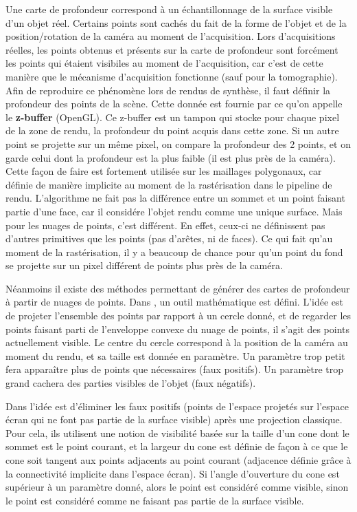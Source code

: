 \documentclass{report}
\begin{document}
Une carte de profondeur correspond à un échantillonnage de la surface visible d'un objet réel. Certains points sont cachés du fait de la forme de l'objet et de la position/rotation de la caméra au moment de l'acquisition. Lors d'acquisitions réelles, les points obtenus et présents sur la carte de profondeur sont forcément les points qui étaient visibiles au moment de l'acquisition, car c'est de cette manière que le mécanisme d'acquisition fonctionne (sauf pour la tomographie).
Afin de reproduire ce phénomène lors de rendus de synthèse, il faut définir la profondeur des points de la scène.
Cette donnée est fournie par ce qu'on appelle le \textbf{z-buffer} (OpenGL). Ce z-buffer est un tampon qui stocke pour chaque pixel de la zone de rendu, la profondeur du point acquis dans cette zone. Si un autre point se projette sur un même pixel, on compare la profondeur des 2 points, et on garde celui dont la profondeur est la plus faible (il est plus près de la caméra).
Cette façon de faire est fortement utilisée sur les maillages polygonaux, car définie de manière implicite au moment de la rastérisation dans le pipeline de rendu. L'algorithme ne fait pas la différence entre un sommet et un point faisant partie d'une face, car il considére l'objet rendu comme une unique surface.
Mais pour les nuages de points, c'est différent. En effet, ceux-ci ne définissent pas d'autres primitives que les points (pas d'arêtes, ni de faces).
Ce qui fait qu'au moment de la rastérisation, il y a beaucoup de chance pour qu'un point du fond se projette sur un pixel différent de points plus près de la caméra.

Néanmoins il existe des méthodes permettant de générer des cartes de profondeur à partir de nuages de points.
Dans \cite{}, un outil mathématique est défini. L'idée est de projeter l'ensemble des points par rapport à un cercle donné, et de regarder les points faisant parti de l'enveloppe convexe du nuage de points, il s'agit des points actuellement visible.
Le centre du cercle correspond à la position de la caméra au moment du rendu, et sa taille est donnée en paramètre.
Un paramètre trop petit fera apparaître plus de points que nécessaires (faux positifs).
Un paramètre trop grand cachera des parties visibles de l'objet (faux négatifs).

Dans \cite{} l'idée est d'éliminer les faux positifs (points de l'espace projetés sur l'espace écran qui ne font pas partie de la surface visible) après une projection classique. Pour cela, ils utilisent une notion de visibilité basée sur la taille d'un cone dont le sommet est le point courant, et la largeur du cone est définie de façon à ce que le cone soit tangent aux points adjacents au point courant (adjacence définie grâce à la connectivité implicite dans l'espace écran).
Si l'angle d'ouverture du cone est supérieur à un paramètre donné, alors le point est considéré comme visible, sinon le point est considéré comme ne faisant pas partie de la surface visible.
\end{document}
